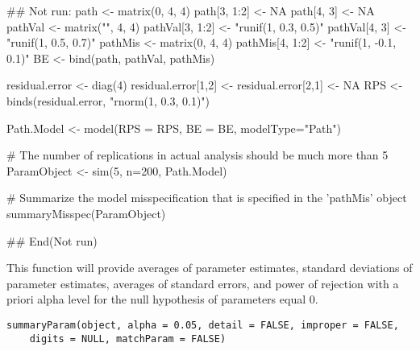 \documentclass[a4paper]{book}
\begin{document}
%
\begin{Examples}
\begin{ExampleCode}
## Not run: 
path <- matrix(0, 4, 4)
path[3, 1:2] <- NA
path[4, 3] <- NA
pathVal <- matrix("", 4, 4)
pathVal[3, 1:2] <- "runif(1, 0.3, 0.5)"
pathVal[4, 3] <- "runif(1, 0.5, 0.7)"
pathMis <- matrix(0, 4, 4)
pathMis[4, 1:2] <- "runif(1, -0.1, 0.1)"
BE <- bind(path, pathVal, pathMis)

residual.error <- diag(4)
residual.error[1,2] <- residual.error[2,1] <- NA
RPS <- binds(residual.error, "rnorm(1, 0.3, 0.1)")

Path.Model <- model(RPS = RPS, BE = BE, modelType="Path")

# The number of replications in actual analysis should be much more than 5
ParamObject <- sim(5, n=200, Path.Model)

# Summarize the model misspecification that is specified in the 'pathMis' object
summaryMisspec(ParamObject)

## End(Not run)
\end{ExampleCode}
\end{Examples}
%
\begin{Description}\relax
This function will provide averages of parameter estimates, standard deviations of parameter estimates, averages of standard errors, and power of rejection with a priori alpha level for the null hypothesis of parameters equal 0.
\end{Description}
%
\begin{Usage}
\begin{verbatim}
summaryParam(object, alpha = 0.05, detail = FALSE, improper = FALSE, 
	digits = NULL, matchParam = FALSE)
\end{verbatim}
\end{Usage}
%
\end{document}
